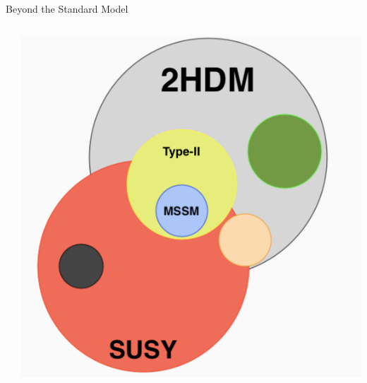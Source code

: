 \documentclass[aspectratio=169,xcolor=table]{beamer}
\def\boxit#1{%
  \smash{\color{red}\fboxrule=1pt\relax\fboxsep=2pt\relax%
  \llap{\rlap{\fbox{\vphantom{0}\makebox[#1]{}}}~}}\ignorespaces
}
\begin{document}
\begin{frame}[t]{Beyond the Standard Model}
\begin{columns}
\begin{itemize}
\begin{itemize}
\begin{itemize}
              \end{itemize}
          \end{itemize}
        \end{itemize}
      \begin{centering}
      \includegraphics[height=.3\textheight,keepaspectratio=true]{SUSY_Bubble.png}
      \end{centering}
      \centering
        \begin{table}[!thp]
          \centering
      \end{table}
      \end{columns}
    \end{frame}
\end{document}
